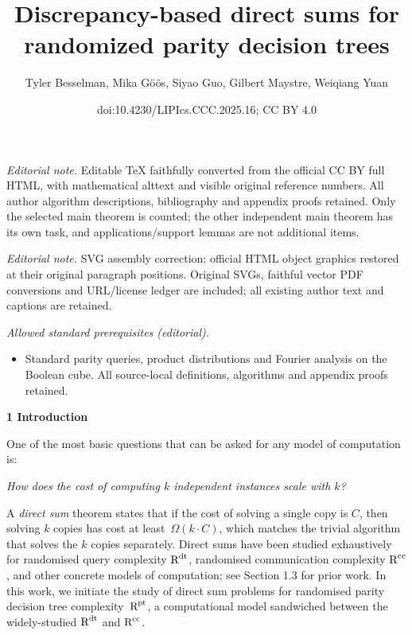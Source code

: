 \documentclass[10pt,a4paper]{article}
\title{Discrepancy-based direct sums for randomized parity decision trees}
\author{Tyler Besselman, Mika Göös, Siyao Guo, Gilbert Maystre, Weiqiang Yuan}
\date{doi:10.4230/LIPIcs.CCC.2025.16; CC BY 4.0}
\begin{document}
\maketitle
\noindent\textit{Editorial note.} Editable TeX faithfully converted from the official CC BY full HTML, with mathematical alttext and visible original reference numbers. All author algorithm descriptions, bibliography and appendix proofs retained. Only the selected main theorem is counted; the other independent main theorem has its own task, and applications/support lemmas are not additional items.\par\medskip
\noindent\textit{Editorial note.} SVG assembly correction: official HTML object graphics restored at their original paragraph positions. Original SVGs, faithful vector PDF conversions and URL/license ledger are included; all existing author text and captions are retained.\par\medskip
\noindent\textit{Allowed standard prerequisites (editorial).}\begin{itemize}
\item Standard parity queries, product distributions and Fourier analysis on the Boolean cube. All source-local definitions, algorithms and appendix proofs retained.
\end{itemize}\medskip


\par\medskip\noindent\textbf{
1 Introduction}\par




One of the most basic questions that can be asked for any model of computation is:\par


\emph{How does the cost of computing $k$ independent instances scale with $k$?}\par


A \emph{direct sum} theorem states that if the cost of solving a single copy is $C$, then solving $k$ copies has cost at least $\Omega(k\cdot C)$, which matches the trivial algorithm that solves the $k$ copies separately. Direct sums have been studied exhaustively for randomised query complexity ${\textup{R}}^{\textup{dt}}$, randomised communication complexity ${\textup{R}}^{\textup{cc}}$, and other concrete models of computation; see Section 1.3 for prior work. In this work, we initiate the study of direct sum problems for randomised parity decision tree complexity ${\textup{R}}^{\textup{pt}}$, a computational model sandwiched between the widely-studied ${\textup{R}}^{\textup{dt}}$ and ${\textup{R}}^{\textup{cc}}$.\par
\end{document}
